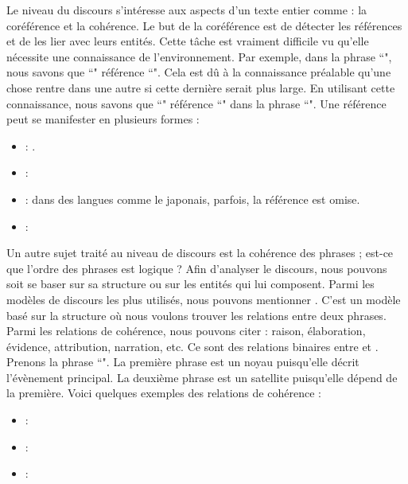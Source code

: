 \documentclass{KodeBook}
\begin{document}
Le niveau du discours s'intéresse aux aspects d'un texte entier comme : la coréférence et la cohérence.
Le but de la coréférence est de détecter les références et de les lier avec leurs entités. 
Cette tâche est vraiment difficile vu qu'elle nécessite une connaissance de l'environnement. 
Par exemple, dans la phrase ``", nous savons que ``" référence ``". 
Cela est dû à la connaissance préalable qu'une chose rentre dans une autre si cette dernière serait plus large.
En utilisant cette connaissance, nous savons que ``" référence ``" dans la phrase ``".
Une référence peut se manifester en plusieurs formes :
\begin{itemize}
	\item {} : .
	\item {} : 
	\item {} : dans des langues comme le japonais, parfois, la référence est omise.
	\item {} : 
\end{itemize}

Un autre sujet traité au niveau de discours est la cohérence des phrases ; est-ce que l'ordre des phrases est logique ?
Afin d'analyser le discours, nous pouvons soit se baser sur sa structure ou sur les entités qui lui composent. 
Parmi les modèles de discours les plus utilisés, nous pouvons mentionner .
C'est un modèle basé sur la structure où nous voulons trouver les relations entre deux phrases. 
Parmi les relations de cohérence, nous pouvons citer : raison, élaboration, évidence, attribution, narration, etc.
Ce sont des relations binaires entre  et .
Prenons la phrase ``".
La première phrase est un noyau puisqu'elle décrit l'évènement principal.
La deuxième phrase est un satellite puisqu'elle dépend de la première.
Voici quelques exemples des relations de cohérence : 
\begin{itemize}
	\item {} : 
	\item {} : 
	\item {} : 
\end{itemize}
\end{document}
